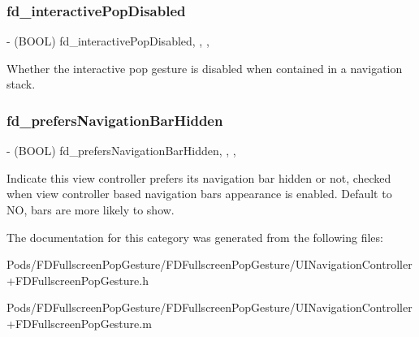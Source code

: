 \subsubsection{\texorpdfstring{fd\+\_\+interactive\+Pop\+Disabled}{fd\_interactivePopDisabled}}
{\footnotesize\ttfamily -\/ (B\+O\+OL) fd\+\_\+interactive\+Pop\+Disabled\hspace{0.3cm}{\ttfamily [read]}, {\ttfamily [write]}, {\ttfamily [nonatomic]}, {\ttfamily [assign]}}

Whether the interactive pop gesture is disabled when contained in a navigation stack. \mbox{\label{category_u_i_view_controller_07_f_d_fullscreen_pop_gesture_08_a03f28adb658220a67d59f687ef9c583d}} 
\subsubsection{\texorpdfstring{fd\+\_\+prefers\+Navigation\+Bar\+Hidden}{fd\_prefersNavigationBarHidden}}
{\footnotesize\ttfamily -\/ (B\+O\+OL) fd\+\_\+prefers\+Navigation\+Bar\+Hidden\hspace{0.3cm}{\ttfamily [read]}, {\ttfamily [write]}, {\ttfamily [nonatomic]}, {\ttfamily [assign]}}

Indicate this view controller prefers its navigation bar hidden or not, checked when view controller based navigation bar\textquotesingle{}s appearance is enabled. Default to NO, bars are more likely to show. 

The documentation for this category was generated from the following files\+:\begin{DoxyCompactItemize}
\item 
Pods/\+F\+D\+Fullscreen\+Pop\+Gesture/\+F\+D\+Fullscreen\+Pop\+Gesture/U\+I\+Navigation\+Controller+\+F\+D\+Fullscreen\+Pop\+Gesture.\+h\item 
Pods/\+F\+D\+Fullscreen\+Pop\+Gesture/\+F\+D\+Fullscreen\+Pop\+Gesture/U\+I\+Navigation\+Controller+\+F\+D\+Fullscreen\+Pop\+Gesture.\+m\end{DoxyCompactItemize}
